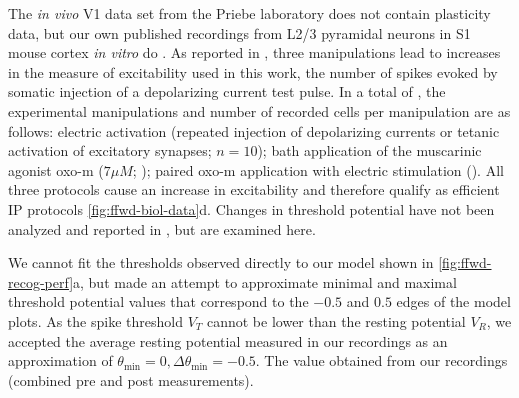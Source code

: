 The \textit{in vivo} V1 data set \citep{Li2020-ej} from the Priebe laboratory does not contain plasticity data,
        but our own published recordings from L2/3 pyramidal neurons in S1 mouse cortex \textit{in vitro} do \citep{Gill2020-wy}.
    As reported in \cite{Gill2020-wy},
        three manipulations lead to increases in the measure of excitability used in this work,
        the number of spikes evoked by somatic injection of a depolarizing current test pulse.
    In a total of
        ,
        the experimental manipulations and number of recorded cells per manipulation are as follows:
        electric activation (repeated injection of depolarizing currents or tetanic activation of excitatory synapses; $n=10$);
        bath application of the muscarinic agonist oxo-m ($7 \mu M$; );
        paired oxo-m application with electric stimulation ().
    All three protocols cause an increase in excitability \citep{Gill2020-wy}
        and therefore qualify as efficient IP protocols \autoref{fig:ffwd-biol-data}d.
    Changes in threshold potential have not been analyzed and reported in \cite{Gill2020-wy},
        but are examined here.


We cannot fit the thresholds observed directly to our model shown in \autoref{fig:ffwd-recog-perf}a,
        but made an attempt to approximate minimal and maximal threshold potential values
        that correspond to the $-0.5$ and $0.5$ edges of the model plots.
    As the spike threshold $V_T$ cannot be lower than the resting potential $V_R$,
        we accepted the average resting potential measured in our recordings
        as an approximation of
        $\theta_{\mathrm{min}} = 0, \Delta \theta_{\mathrm{min}} = -0.5$.
    The value obtained from our recordings
        (combined pre and post measurements).

